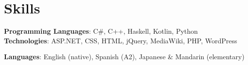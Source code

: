 \section{Skills}
    \begin{itemize}[leftmargin=0.15in, label={}]
	\small{\item{
		\textbf{Programming Languages}{: C\#, C++, Haskell, Kotlin, Python} \\
		\textbf{Technologies}{: ASP.NET, CSS, HTML, jQuery, MediaWiki, PHP, WordPress} \\
	}}
 	\small{\item{
		\textbf{Languages}{: English (native), Spanish (A2), Japanese \& Mandarin (elementary)} \\
	}}
    \end{itemize}